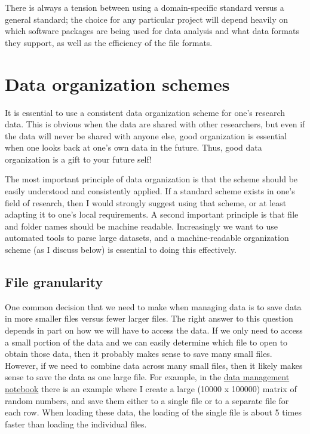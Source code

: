 There is always a tension between using a domain-specific standard versus a general standard; the choice for any particular project will depend heavily on which software packages are being used for data analysis and what data formats they support, as well as the efficiency of the file formats.

\section{Data organization schemes}

It is essential to use a consistent data organization scheme for one's research data. This is obvious when the data are shared with other researchers, but even if the data will never be shared with anyone else, good organization is essential when one looks back at one's own data in the future. Thus, good data organization is a gift to your future self!

The most important principle of data organization is that the scheme should be easily understood and consistently applied.  If a standard scheme exists in one's field of research, then I would strongly suggest using that scheme, or at least adapting it to one's local requirements. A second important principle is that file and folder names should be machine readable. Increasingly we want to use automated tools to parse large datasets, and a machine-readable organization scheme (as I discuss below) is essential to doing this effectively.

\subsection{File granularity}

One common decision that we need to make when managing data is to save data in more smaller files versus fewer larger files.  The right answer to this question depends in part on how we will have to access the data.  If we only need to access a small portion of the data and we can easily determine which file to open to obtain those data, then it probably makes sense to save many small files.  However, if we need to combine data across many small files, then it likely makes sense to save the data as one large file.  For example, in the \href{src/bettercode/data\_management.ipynb}{data management notebook} there is an example where I create a large (10000 x 100000) matrix of random numbers, and save them either to a single file or to a separate file for each row.  When loading these data, the loading of the single file is about 5 times faster than loading the individual files.


